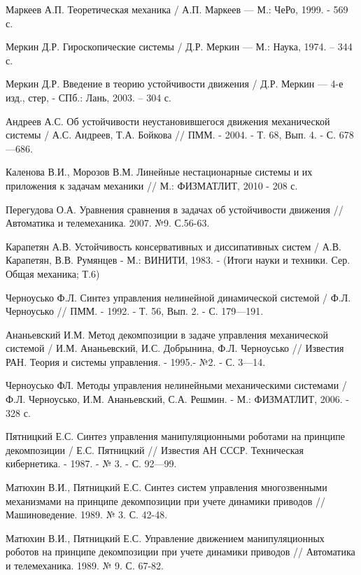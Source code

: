 \begin{thebibliography}{10}
	Маркеев А.П. Теоретическая механика / А.П. Маркеев — М.: ЧеРо, 1999. - 569 с.
	
	Меркин Д.Р. Гироскопические системы / Д.Р. Меркин — М.: Наука, 1974. -- 344 с.
	
	Меркин Д.Р. Введение в теорию устойчивости движения / Д.Р. Меркин — 4-е изд., стер, - СПб.: Лань, 2003. -- 304 с.
	
	Андреев А.С. Об устойчивости неустановившегося движения механической системы / А.С. Андреев, Т.А. Бойкова // ПММ. - 2004. - Т. 68, Вып. 4. - С. 678—686.
	
	Каленова В.И., Морозов В.М. Линейные нестационарные системы и их приложения к задачам механики // М.: ФИЗМАТЛИТ, 2010 - 208 с.
	
	Перегудова О.А. Уравнения сравнения в задачах об устойчивости движения // Автоматика и телемеханика. 2007. №9. С.56-63.
	
	Карапетян А.В. Устойчивость консервативных и диссипативных систем / А.В. Карапетян, В.В. Румянцев - М.: ВИНИТИ, 1983. - (Итоги науки и техники. Сер. Общая механика; Т.6)
	
	Черноусько Ф.Л. Синтез управления нелинейной динамической системой / Ф.Л. Черноусько // ПММ. - 1992. - Т. 56, Вып. 2. - С. 179—191.
	
	Ананьевский И.М. Метод декомпозиции в задаче управления механической системой / И.М. Ананьевский, И.С. Добрынина, Ф.Л. Черноусько // Известия РАН. Теория и системы управления. - 1995.- №2. - С. 3—14.
	
	Черноусько ФЛ. Методы управления нелинейными механическими системами / Ф.Л. Черноусько, И.М. Ананьевский, С.А. Решмин. - М.: ФИЗМАТЛИТ, 2006. - 328 с.
	
	Пятницкий Е.С. Синтез управления манипуляционными роботами на принципе декомпозиции / Е.С. Пятницкий // Известия АН СССР. Техническая кибернетика. - 1987. - № 3. - С. 92—99.
	
	Матюхин В.И., Пятницкий Е.С. Синтез систем управления многозвенными механизмами на принципе декомпозиции при учете динамики приводов // Машиноведение. 1989. № 3. С. 42-48.
	
	Матюхин В.И., Пятницкий Е.С. Управление движением манипуляционных роботов на принципе декомпозиции при учете динамики приводов // Автоматика и телемеханика. 1989. № 9. С. 67-82.
	

\end{thebibliography}
